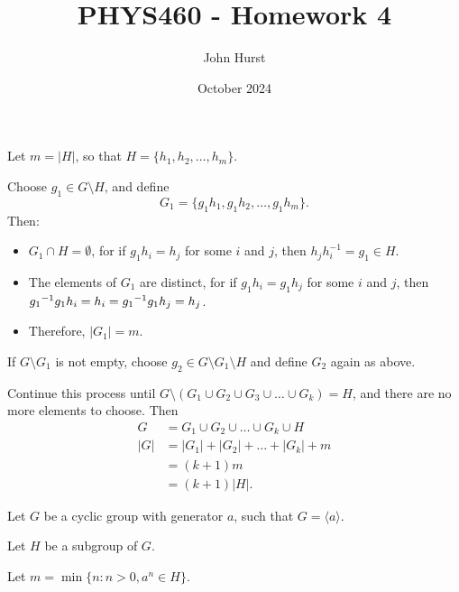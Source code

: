 \documentclass[12pt]{extarticle}
\title{PHYS460 - Homework 4}
\author{John Hurst}
\date{October 2024}
\begin{document}
\maketitle


Let $m=|H|$, so that $H = \{h_1, h_2, \ldots, h_m\}$.

Choose $g_1 \in G \setminus H$, and define
\[
G_1 = \{g_1h_1, g_1h_2, \ldots, g_1h_m\}.
\]
Then:
\begin{itemize}
\item $G_1 \cap H = \emptyset$, for if $g_1h_i = h_j$ for some $i$ and $j$, then $h_jh_i^{-1}= g_1 \in H$.
\item The elements of $G_1$ are distinct, for if $g_1h_i = g_1h_j$ for some $i$ and $j$, then ${{g_1}^{-1}}g_1h_i = h_i = {{g_1}^{-1}}g_1h_j = h_j$.
\item Therefore, $|G_1| = m$.
\end{itemize}

If $G\setminus G_1$ is not empty, choose $g_2 \in G\setminus G_1 \setminus H$ and define $G_2$ again as above.

Continue this process until $G \setminus (G_1 \cup G_2 \cup G_3 \cup \ldots \cup G_k) = H$, and there are no more elements to choose.
Then
\begin{align*}
G & = G_1 \cup G_2 \cup \ldots \cup G_k \cup H \\
|G| & = |G_1| + |G_2| + \ldots + |G_k| + m \\
& = (k+1)m \\
& = (k+1)|H|.
\end{align*}



Let $G$ be a cyclic group with generator $a$, such that $G = \langle a \rangle$.

Let $H$ be a subgroup of $G$.

Let $m=\min\{n: n>0, a^n \in H\}$.
\end{document}
